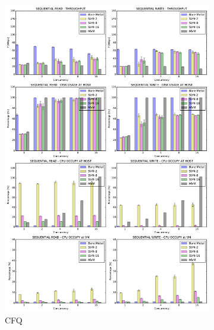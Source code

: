 \documentclass{acmsig}
\begin{document}
\begin{figure}[t]
   \centering
   \begin{subfigure}[b]{0.5\textwidth}
     \includegraphics[width=\textwidth]{figures/cfq.pdf}
     \caption{CFQ}
     \label{fig:aggthroughput_cfq}
   \end{subfigure}%
   ~ %
   \begin{subfigure}[b]{0.5\textwidth}

\end{subfigure}
\end{figure}
\end{document}
